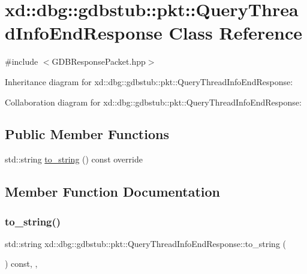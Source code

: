 \hypertarget{classxd_1_1dbg_1_1gdbstub_1_1pkt_1_1_query_thread_info_end_response}{}\section{xd\+:\+:dbg\+:\+:gdbstub\+:\+:pkt\+:\+:Query\+Thread\+Info\+End\+Response Class Reference}
\label{classxd_1_1dbg_1_1gdbstub_1_1pkt_1_1_query_thread_info_end_response}


{\ttfamily \#include $<$G\+D\+B\+Response\+Packet.\+hpp$>$}



Inheritance diagram for xd\+:\+:dbg\+:\+:gdbstub\+:\+:pkt\+:\+:Query\+Thread\+Info\+End\+Response\+:


Collaboration diagram for xd\+:\+:dbg\+:\+:gdbstub\+:\+:pkt\+:\+:Query\+Thread\+Info\+End\+Response\+:
\subsection*{Public Member Functions}
\begin{DoxyCompactItemize}
\item 
std\+::string \mbox{\hyperlink{classxd_1_1dbg_1_1gdbstub_1_1pkt_1_1_query_thread_info_end_response_a04012a6b5db47bee9d27062680a5389b}{to\+\_\+string}} () const override
\end{DoxyCompactItemize}


\subsection{Member Function Documentation}
\mbox{\label{classxd_1_1dbg_1_1gdbstub_1_1pkt_1_1_query_thread_info_end_response_a04012a6b5db47bee9d27062680a5389b}} 
\subsubsection{\texorpdfstring{to\+\_\+string()}{to\_string()}}
{\footnotesize\ttfamily std\+::string xd\+::dbg\+::gdbstub\+::pkt\+::\+Query\+Thread\+Info\+End\+Response\+::to\+\_\+string (\begin{DoxyParamCaption}{ }\end{DoxyParamCaption}) const\hspace{0.3cm}{\ttfamily [inline]}, {\ttfamily [override]}, {\ttfamily [virtual]}}



